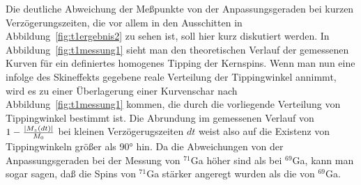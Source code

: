 Die deutliche Abweichung der Meßpunkte von der Anpassungsgeraden bei kurzen Verzögerungszeiten,
die vor allem in den Ausschitten in Abbildung~\ref{fig:t1ergebnis2} zu sehen ist, soll hier kurz
diskutiert werden. In Abbildung~\ref{fig:t1messung1} sieht man den theoretischen Verlauf der
gemessenen Kurven für ein definiertes homogenes Tipping der Kernspins. Wenn man nun eine infolge
des Skineffekts gegebene reale Verteilung der Tippingwinkel annimmt, wird es zu einer Überlagerung
einer Kurvenschar nach Abbildung~\ref{fig:t1messung1} kommen, die durch die vorliegende Verteilung
von Tippingwinkel bestimmt ist. Die Abrundung im gemessenen Verlauf von
$1-\frac{\abs{M_z(dt)}}{M_0}$ bei kleinen Verzögerugszeiten $dt$ weist also auf die Existenz von
Tippingwinkeln größer als 90° hin. Da die Abweichungen von der Anpassungsgeraden bei der Messung
von $^{71}$Ga höher sind als bei $^{69}$Ga, kann man sogar sagen, daß die Spins von $^{71}$Ga
stärker angeregt wurden als die von $^{69}$Ga.

